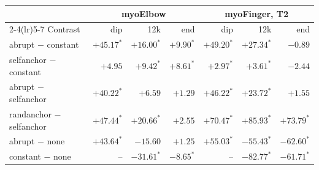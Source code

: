 \begin{tabular}{@{}lrrrrrr@{}}
\toprule
 & \multicolumn{3}{c}{myoElbow} & \multicolumn{3}{c}{myoFinger, T2}\\
\cmidrule(lr){2-4}\cmidrule(lr){5-7}
Contrast & dip & 12k & end & dip & 12k & end\\
\midrule
abrupt $-$ constant        & $+45.17^{*}$ & $+16.00^{*}$ & $+9.90^{*}$ & $+49.20^{*}$ & $+27.34^{*}$ & $-0.89$\\
selfanchor $-$ constant    & $+4.95$ & $+9.42^{*}$ & $+8.61^{*}$ & $+2.97^{*}$ & $+3.61^{*}$ & $-2.44$\\
abrupt $-$ selfanchor      & $+40.22^{*}$ & $+6.59$ & $+1.29$ & $+46.22^{*}$ & $+23.72^{*}$ & $+1.55$\\
randanchor $-$ selfanchor  & $+47.44^{*}$ & $+20.66^{*}$ & $+2.55$ & $+70.47^{*}$ & $+85.93^{*}$ & $+73.79^{*}$\\
abrupt $-$ none            & $+43.64^{*}$ & $-15.60$ & $+1.25$ & $+55.03^{*}$ & $-55.43^{*}$ & $-62.60^{*}$\\
constant $-$ none          & -- & $-31.61^{*}$ & $-8.65^{*}$ & -- & $-82.77^{*}$ & $-61.71^{*}$\\
\bottomrule
\end{tabular}
